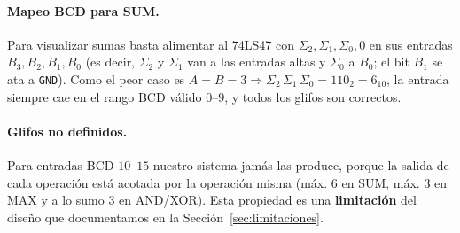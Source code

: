 \documentclass[a4paper,12pt]{article}
\begin{document}
\paragraph{Mapeo BCD para SUM.}
Para visualizar sumas basta alimentar al 74LS47 con
$\Sigma_2, \Sigma_1, \Sigma_0, 0$ en sus entradas
$B_3, B_2, B_1, B_0$ (es decir, $\Sigma_2$ y $\Sigma_1$ van a las
entradas altas y $\Sigma_0$ a $B_0$; el bit $B_1$ se ata a \texttt{GND}).
Como el peor caso es $A = B = 3 \Rightarrow \Sigma_2\,\Sigma_1\,\Sigma_0
= 110_2 = 6_{10}$, la entrada siempre cae en el rango BCD v\'{a}lido
$0$--$9$, y todos los glifos son correctos.

\paragraph{Glifos no definidos.} Para entradas BCD $10$--$15$
nuestro sistema jam\'{a}s las produce, porque la salida de cada
operaci\'{o}n est\'{a} acotada por la operaci\'{o}n misma (m\'{a}x.
$6$ en SUM, m\'{a}x. $3$ en MAX y a lo sumo $3$ en AND/XOR). Esta
propiedad es una \textbf{limitaci\'{o}n} del dise\~{n}o que
documentamos en la Secci\'{o}n~\ref{sec:limitaciones}.

\end{document}
